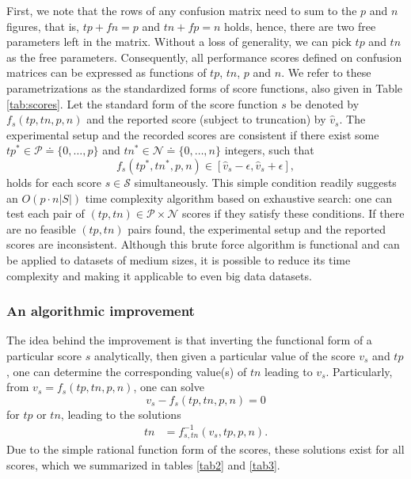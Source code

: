 \documentclass[5p, final]{elsarticle}
\begin{document}
First, we note that the rows of any confusion matrix need to sum to the $p$ and $n$ figures, that is, $tp + fn = p$ and $tn + fp = n$ holds, hence, there are two free parameters left in the matrix. Without a loss of generality, we can pick $tp$ and $tn$ as the free parameters. Consequently, all performance scores defined on confusion matrices can be expressed as functions of $tp$, $tn$, $p$ and $n$. We refer to these parametrizations as the standardized forms of score functions, also given in Table \ref{tab:scores}. Let the standard form of the score function $s$ be denoted by $f_s(tp, tn, p, n)$ and the reported score (subject to truncation) by $\hat{v}_s$. The experimental setup and the recorded scores are consistent if there exist some $tp^* \in \mathcal{P} \doteq \lbrace 0, \dots, p\rbrace$ and $tn^*\in\mathcal{N}\doteq \lbrace 0, \dots, n\rbrace$ integers, such that
\begin{equation}
\label{eqtest0}
f_s(tp^*, tn^*, p, n) \in [\hat{v}_s - \epsilon, \hat{v}_s + \epsilon],
\end{equation}
holds for each score $s\in\mathcal{S}$ simultaneously. This simple condition readily suggests an $O(p\cdot n\vert S\vert)$ time complexity algorithm based on exhaustive search: 
one can test each pair of $(tp, tn)\in \mathcal{P}\times\mathcal{N}$ scores if they satisfy these conditions. If there are no feasible $(tp, tn)$ pairs found, the experimental setup and the reported scores are inconsistent. Although this brute force algorithm is functional and can be applied to datasets of medium sizes, it is possible to reduce its time complexity and making it applicable to even big data datasets.

\subsubsection{An algorithmic improvement}

The idea behind the improvement is that inverting the functional form of a particular score $s$ analytically, then given a particular value of the score $v_s$ and $tp$, one can determine the corresponding value(s) of $tn$ leading to $v_s$. Particularly, from $v_s = f_s(tp, tn, p, n)$, one can solve 
\begin{equation}
v_s - f_s(tp, tn, p, n) = 0
\end{equation}
for $tp$ or $tn$, leading to the solutions
\begin{align}
\label{eq:solution}
tn &= f_{s, tn}^{-1}(v_s, tp, p, n).
\end{align}
Due to the simple rational function form of the scores, these solutions exist for all scores, which we summarized in tables \ref{tab2} and \ref{tab3}.
\end{document}
